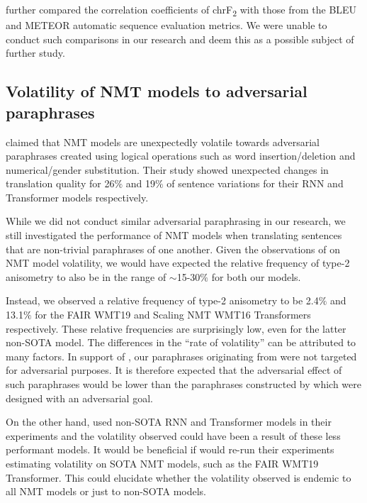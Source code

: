\documentclass[11pt,a4paper]{article}
\begin{document}
\citet{michel2019evaluation} further compared the correlation coefficients of chrF\textsubscript{2} with those from the BLEU \cite{papineni2002bleu} and METEOR \cite{denkowski2014meteor} automatic sequence evaluation metrics. We were unable to conduct such comparisons in our research and deem this as a possible subject of further study. 

\subsection{Volatility of NMT models to adversarial paraphrases}

\citet{fadaee2020unreasonable} claimed that NMT models are unexpectedly volatile towards adversarial paraphrases created using logical operations such as word insertion/deletion and numerical/gender substitution. Their study showed unexpected changes in translation quality for 26$\%$ and 19$\%$ of sentence variations for their RNN and Transformer models respectively.

While we did not conduct similar adversarial paraphrasing in our research, we still investigated the performance of NMT models when translating sentences that are non-trivial paraphrases of one another. Given the observations of \citet{fadaee2020unreasonable} on NMT model volatility, we would have expected the relative frequency of type-2 anisometry to also be in the range of $\sim$15-30$\%$ for both our models.

Instead, we observed a relative frequency of type-2 anisometry to be 2.4$\%$ and 13.1$\%$ for the FAIR WMT19 and Scaling NMT WMT16 Transformers respectively. These relative frequencies are surprisingly low, even for the latter non-SOTA model. The differences in the ``rate of volatility'' can be attributed to many factors. In support of \citet{fadaee2020unreasonable}, our paraphrases originating from \citet{freitag-bleu-paraphrase-references-2020} were not targeted for adversarial purposes. It is therefore expected that the adversarial effect of such paraphrases would be lower than the paraphrases constructed by \citet{fadaee2020unreasonable} which were designed with an adversarial goal.

On the other hand, \citet{fadaee2020unreasonable} used non-SOTA RNN and Transformer models in their experiments and the volatility observed could have been a result of these less performant models. It would be beneficial if \citet{fadaee2020unreasonable} would re-run their experiments estimating volatility on SOTA NMT models, such as the FAIR WMT19 Transformer. This could elucidate whether the volatility observed is endemic to all NMT models or just to non-SOTA models. 
\end{document}
